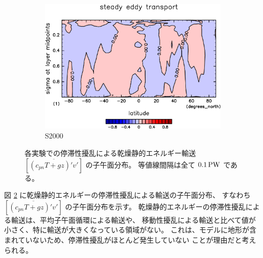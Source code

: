 \documentclass[body]{subfiles}
\begin{document}
\begin{figure}[t]
\begin{subfigure}{.4\textwidth}
		\includegraphics[width=\columnwidth]{S2000/MeriHeatTransTest@dryStatEn_SE,time=7300:7665-crop-rotate.pdf}
		\caption{S2000}\label{乾燥静的エネルギー停滞性擾乱S2000}
	\end{subfigure}
	\caption[各実験でのに停滞性擾乱依る乾燥静的エネルギー輸送の子午面分布]{
		各実験での停滞性擾乱による乾燥静的エネルギー輸送 \([\overline{(c_{pn}T+gz)'v'}]\) の子午面分布。
		等値線間隔は全て \(0.1\hmu{PW}\) である。
	}\label{乾燥静的エネルギー停滞性擾乱}
\end{figure}

図 \ref{乾燥静的エネルギー停滞性擾乱} に乾燥静的エネルギーの停滞性擾乱による輸送の子午面分布、
すなわち \([\overline{(c_{pn}T+gz)'v'}]\) の子午面分布を示す。
乾燥静的エネルギーの停滞性擾乱による輸送は、平均子午面循環による輸送や、
移動性擾乱による輸送と比べて値が小さく、特に輸送が大きくなっている領域がない。
これは、モデルに地形が含まれていないため、停滞性擾乱がほとんど発生していない
ことが理由だと考えられる。

\afterpage{\clearpage}
\end{document}
